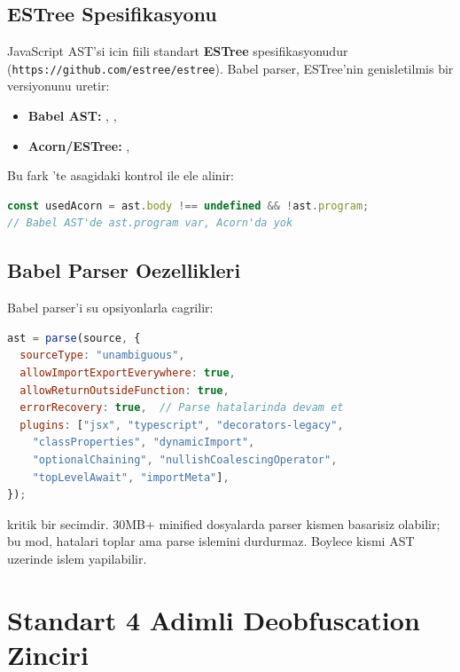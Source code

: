 \subsection{ESTree Spesifikasyonu}

JavaScript AST'si icin fiili standart \textbf{ESTree} spesifikasyonudur (\texttt{https://github.com/estree/estree}). Babel parser, ESTree'nin genisletilmis bir versiyonunu uretir:

\begin{itemize}
\item \textbf{Babel AST:} , , 
\item \textbf{Acorn/ESTree:} , 
\end{itemize}

Bu fark 'te asagidaki kontrol ile ele alinir:

\begin{lstlisting}[language=JavaScript, caption={Babel vs Acorn AST tespiti (deobfuscate.mjs)}]
const usedAcorn = ast.body !== undefined && !ast.program;
// Babel AST'de ast.program var, Acorn'da yok
\end{lstlisting}

\subsection{Babel Parser Oezellikleri}

 Babel parser'i su opsiyonlarla cagrilir:

\begin{lstlisting}[language=JavaScript, caption={Babel parser konfigurasyonu}]
ast = parse(source, {
  sourceType: "unambiguous",
  allowImportExportEverywhere: true,
  allowReturnOutsideFunction: true,
  errorRecovery: true,  // Parse hatalarinda devam et
  plugins: ["jsx", "typescript", "decorators-legacy",
    "classProperties", "dynamicImport",
    "optionalChaining", "nullishCoalescingOperator",
    "topLevelAwait", "importMeta"],
});
\end{lstlisting}

 kritik bir secimdir. 30MB+ minified dosyalarda parser kismen basarisiz olabilir; bu mod, hatalari toplar ama parse islemini durdurmaz. Boylece kismi AST uzerinde islem yapilabilir.


\section{Standart 4 Adimli Deobfuscation Zinciri}
\label{sec:std-chain-detail}

